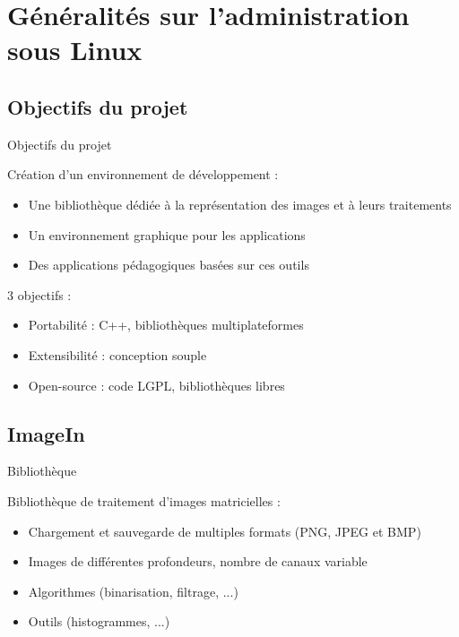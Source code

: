 \section{Généralités sur l'administration sous Linux}

\subsection{Objectifs du projet}
\begin{frame}{Objectifs du projet}

	Création d'un environnement de développement :
	
	\begin{itemize}
		\item Une bibliothèque dédiée à la représentation des images et à leurs traitements
		\item Un environnement graphique pour les applications
		\item Des applications pédagogiques basées sur ces outils
	\end{itemize}

	3 objectifs :
	
	\begin{itemize}
		\item Portabilité : C++, bibliothèques multiplateformes
		\item Extensibilité : conception souple
		\item Open-source : code LGPL, bibliothèques libres
	\end{itemize}
	
\end{frame}

\subsection{ImageIn}
\begin{frame}{Bibliothèque }

	Bibliothèque de traitement d'images matricielles :
	
	\begin{itemize}
		\item Chargement et sauvegarde de multiples formats (PNG, JPEG et BMP)
		\item Images de différentes profondeurs, nombre de canaux variable
		\item Algorithmes (binarisation, filtrage, ...)
		\item Outils (histogrammes, ...)
	\end{itemize}
	
\end{frame}

